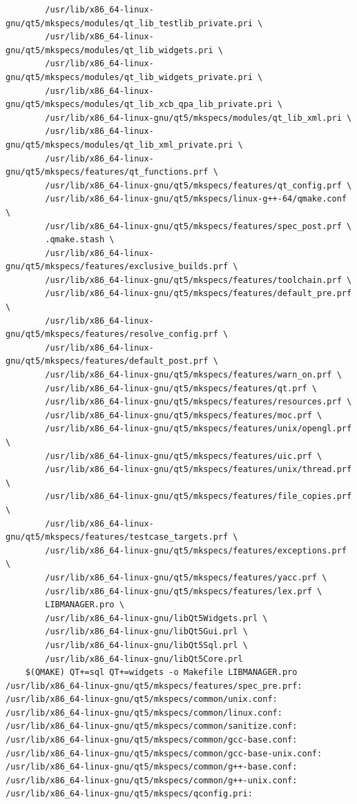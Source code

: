 \documentclass[a4paper]{article}
\begin{document}
\begin{verbatim}
		/usr/lib/x86_64-linux-gnu/qt5/mkspecs/modules/qt_lib_testlib_private.pri \
		/usr/lib/x86_64-linux-gnu/qt5/mkspecs/modules/qt_lib_widgets.pri \
		/usr/lib/x86_64-linux-gnu/qt5/mkspecs/modules/qt_lib_widgets_private.pri \
		/usr/lib/x86_64-linux-gnu/qt5/mkspecs/modules/qt_lib_xcb_qpa_lib_private.pri \
		/usr/lib/x86_64-linux-gnu/qt5/mkspecs/modules/qt_lib_xml.pri \
		/usr/lib/x86_64-linux-gnu/qt5/mkspecs/modules/qt_lib_xml_private.pri \
		/usr/lib/x86_64-linux-gnu/qt5/mkspecs/features/qt_functions.prf \
		/usr/lib/x86_64-linux-gnu/qt5/mkspecs/features/qt_config.prf \
		/usr/lib/x86_64-linux-gnu/qt5/mkspecs/linux-g++-64/qmake.conf \
		/usr/lib/x86_64-linux-gnu/qt5/mkspecs/features/spec_post.prf \
		.qmake.stash \
		/usr/lib/x86_64-linux-gnu/qt5/mkspecs/features/exclusive_builds.prf \
		/usr/lib/x86_64-linux-gnu/qt5/mkspecs/features/toolchain.prf \
		/usr/lib/x86_64-linux-gnu/qt5/mkspecs/features/default_pre.prf \
		/usr/lib/x86_64-linux-gnu/qt5/mkspecs/features/resolve_config.prf \
		/usr/lib/x86_64-linux-gnu/qt5/mkspecs/features/default_post.prf \
		/usr/lib/x86_64-linux-gnu/qt5/mkspecs/features/warn_on.prf \
		/usr/lib/x86_64-linux-gnu/qt5/mkspecs/features/qt.prf \
		/usr/lib/x86_64-linux-gnu/qt5/mkspecs/features/resources.prf \
		/usr/lib/x86_64-linux-gnu/qt5/mkspecs/features/moc.prf \
		/usr/lib/x86_64-linux-gnu/qt5/mkspecs/features/unix/opengl.prf \
		/usr/lib/x86_64-linux-gnu/qt5/mkspecs/features/uic.prf \
		/usr/lib/x86_64-linux-gnu/qt5/mkspecs/features/unix/thread.prf \
		/usr/lib/x86_64-linux-gnu/qt5/mkspecs/features/file_copies.prf \
		/usr/lib/x86_64-linux-gnu/qt5/mkspecs/features/testcase_targets.prf \
		/usr/lib/x86_64-linux-gnu/qt5/mkspecs/features/exceptions.prf \
		/usr/lib/x86_64-linux-gnu/qt5/mkspecs/features/yacc.prf \
		/usr/lib/x86_64-linux-gnu/qt5/mkspecs/features/lex.prf \
		LIBMANAGER.pro \
		/usr/lib/x86_64-linux-gnu/libQt5Widgets.prl \
		/usr/lib/x86_64-linux-gnu/libQt5Gui.prl \
		/usr/lib/x86_64-linux-gnu/libQt5Sql.prl \
		/usr/lib/x86_64-linux-gnu/libQt5Core.prl
	$(QMAKE) QT+=sql QT+=widgets -o Makefile LIBMANAGER.pro
/usr/lib/x86_64-linux-gnu/qt5/mkspecs/features/spec_pre.prf:
/usr/lib/x86_64-linux-gnu/qt5/mkspecs/common/unix.conf:
/usr/lib/x86_64-linux-gnu/qt5/mkspecs/common/linux.conf:
/usr/lib/x86_64-linux-gnu/qt5/mkspecs/common/sanitize.conf:
/usr/lib/x86_64-linux-gnu/qt5/mkspecs/common/gcc-base.conf:
/usr/lib/x86_64-linux-gnu/qt5/mkspecs/common/gcc-base-unix.conf:
/usr/lib/x86_64-linux-gnu/qt5/mkspecs/common/g++-base.conf:
/usr/lib/x86_64-linux-gnu/qt5/mkspecs/common/g++-unix.conf:
/usr/lib/x86_64-linux-gnu/qt5/mkspecs/qconfig.pri:

\end{verbatim}
\end{document}
